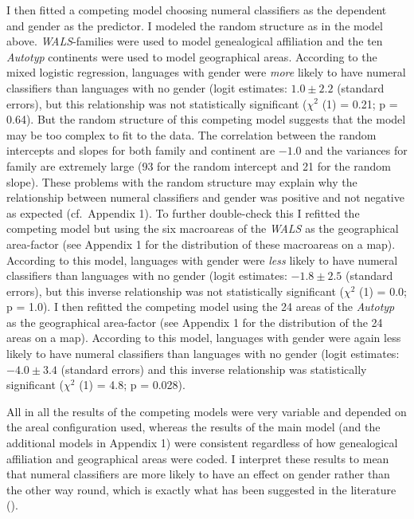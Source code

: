 \documentclass[output=collectionpaper]{langsci/langscibook}
\begin{document}
I then fitted a competing model choosing numeral classifiers as the dependent and gender as the predictor. I modeled the random structure as in the model above. \textit{WALS}{}-families were used to model genealogical affiliation and the ten \textit{Autotyp} continents were used to model geographical areas. According to the mixed logistic regression, languages with gender were \emph{more} likely to have numeral classifiers than languages with no gender (logit estimates: $1.0 \pm 2.2$ (standard errors), but this relationship was not statistically significant ($\chi^2$ (1) = 0.21; p = 0.64). But the random structure of this competing model suggests that the model may be too complex to fit to the data. The correlation between the random intercepts and slopes for both family and continent are $-1.0$ and the variances for family are extremely large (93 for the random intercept and 21 for the random slope). These problems with the random structure may explain why the relationship between numeral classifiers and gender was positive and not negative as expected (cf.\ Appendix 1). To further double-check this I refitted the competing model but using the six macroareas of the \textit{WALS} as the geographical area-factor (see Appendix 1 for the distribution of these macroareas on a map). According to this model, languages with gender were \textit{less} likely to have numeral classifiers than languages with no gender (logit estimates: $-1.8 \pm 2.5$ (standard errors), but this inverse relationship was not statistically significant ($\chi^2$ (1) = 0.0; p = 1.0). I then refitted the competing model using the 24 areas of the \textit{Autotyp} as the geographical area-factor (see Appendix 1 for the distribution of the 24 areas on a map). According to this model, languages with gender were again less likely to have numeral classifiers than languages with no gender (logit estimates: $-4.0 \pm 3.4$ (standard errors) and this inverse relationship was statistically significant ($\chi^2$ (1) = 4.8; p = 0.028).

All in all the results of the competing models were very variable and depended on the areal configuration used, whereas the results of the main model (and the additional models in Appendix 1) were consistent regardless of how genealogical affiliation and geographical areas were coded. I interpret these results to mean that numeral classifiers are more likely to have an effect on gender rather than the other way round, which is exactly what has been suggested in the literature ().
\end{document}
